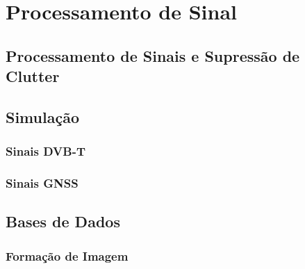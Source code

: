 
\chapter{Processamento de Sinal} %
\label{chap:Chapter4} %


\section{Processamento de Sinais e Supressão de Clutter}



\section{Simulação}

\subsection{Sinais DVB-T}

\subsection{Sinais GNSS}



\section{Bases de Dados}

\subsection{Formação de Imagem}